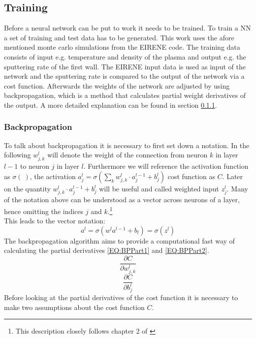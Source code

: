 		\subsection{Training}
			Before a neural network can be put to work it needs to be trained. To train a NN a set of training and test data has to be generated. This work uses the afore mentioned monte carlo simulations from the EIRENE code.
			The training data consists of input e.g. temperature and density of the plasma and output e.g. the sputtering rate of the first wall. The EIRENE input data is used as input of the network and the sputtering rate is compared to the output of the network via a cost function. Afterwards the weights of the network are adjusted by using backpropagation, which is a method that calculates partial weight derivatives of the output. A more detailed explanation can be found in section \ref{BackProp}.\\
			\subsubsection{Backpropagation}
				\label{BackProp}
				To talk about backpropagation it is necessary to first set down a notation. In the following $w^l_{j,k}$ will denote the weight of the connection from neuron $k$ in layer $l-1$ to neuron $j$ in layer $l$. Furthermore we will reference the activation function as $\sigma(\:)$, the activation $a^l_j = \sigma \left( \sum^{}_{k} w^l_{j,k} \cdot a^{l-1}_j +b^l_j \right)$ cost function as $C$. Later on the quantity $w^l_{j,k} \cdot a^{l-1}_j +b^l_j$ will be useful and called weighted input $z^l_j$. Many of the notation above can be understood as a vector across neurons of a layer, hence omitting the indices $j$ and $k$.\footnote{This description closely follows chapter 2 of \cite{NNEBook}}\\
				This leads to the vector notation:
				\begin{equation}
					a^l = \sigma(w^l a^{l-1} + b_l) = \sigma(z^l)
					\label{EQ:Activation}
				\end{equation}
				The backpropagation algorithm aims to provide a computational fast way of calculating the partial derivatives \ref{EQ:BPPart1} and \ref{EQ:BPPart2}. 
				\begin{equation}
					\frac{\partial C}{\partial w^l_{j,k}}
					\label{EQ:BPPart1}
				\end{equation}
				\begin{equation}
					\frac{\partial C}{\partial b^l_j}
					\label{EQ:BPPart2}
				\end{equation}
				Before looking at the partial derivatives of the cost function it is necessary to make two assumptions about the cost function $C$.			
